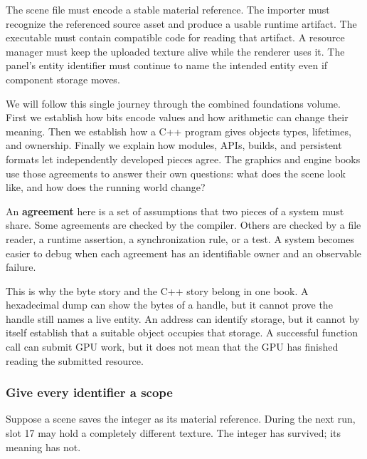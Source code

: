 The scene file must encode a stable material reference. The importer must recognize the referenced source asset and produce a usable runtime artifact. The executable must contain compatible code for reading that artifact. A resource manager must keep the uploaded texture alive while the renderer uses it. The panel's entity identifier must continue to name the intended entity even if component storage moves.

We will follow this single journey through the combined foundations volume. First we establish how bits encode values and how arithmetic can change their meaning. Then we establish how a C++ program gives objects types, lifetimes, and ownership. Finally we explain how modules, APIs, builds, and persistent formats let independently developed pieces agree. The graphics and engine books use those agreements to answer their own questions: what does the scene look like, and how does the running world change?

An \textbf{agreement} here is a set of assumptions that two pieces of a system must share. Some agreements are checked by the compiler. Others are checked by a file reader, a runtime assertion, a synchronization rule, or a test. A system becomes easier to debug when each agreement has an identifiable owner and an observable failure.


This is why the byte story and the C++ story belong in one book. A hexadecimal dump can show the bytes of a handle, but it cannot prove the handle still names a live entity. An address can identify storage, but it cannot by itself establish that a suitable object occupies that storage. A successful function call can submit GPU work, but it does not mean that the GPU has finished reading the submitted resource.

\subsubsection{Give every identifier a scope}\label{05-engine-i-ch001-give-every-identifier-a-scope}

\hypertarget{05-engine-i-ch001-give-every-identifier-a-scope}{}

Suppose a scene saves the integer  as its material reference. During the next run, slot 17 may hold a completely different texture. The integer has survived; its meaning has not.


